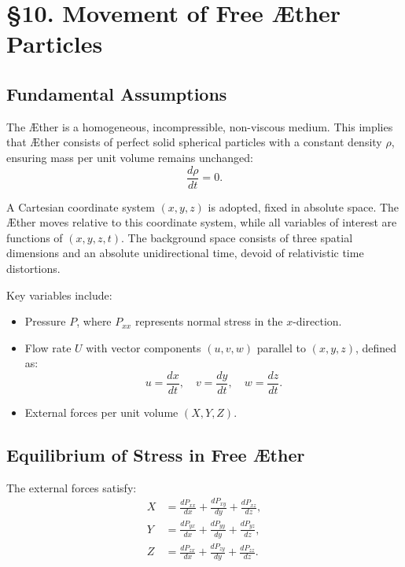 

    \section*{§10. Movement of Free Æther Particles}

    \subsection*{Fundamental Assumptions}
    The Æther is a homogeneous, incompressible, non-viscous medium. This implies that Æther consists of perfect solid spherical particles with a constant density $\rho$, ensuring mass per unit volume remains unchanged:
    \begin{equation}
        \frac{d \rho}{d t} = 0.
    \end{equation}

    A Cartesian coordinate system $(x, y, z)$ is adopted, fixed in absolute space. The Æther moves relative to this coordinate system, while all variables of interest are functions of $(x, y, z, t)$. The background space consists of three spatial dimensions and an absolute unidirectional time, devoid of relativistic time distortions.

    Key variables include:
    \begin{itemize}
        \item Pressure $P$, where $P_{xx}$ represents normal stress in the $x$-direction.
        \item Flow rate $U$ with vector components $(u, v, w)$ parallel to $(x, y, z)$, defined as:
        \begin{equation}
            u = \frac{dx}{dt}, \quad v = \frac{dy}{dt}, \quad w = \frac{dz}{dt}.
        \end{equation}
        \item External forces per unit volume $(X, Y, Z)$.
    \end{itemize}

    \subsection*{Equilibrium of Stress in Free Æther}
    The external forces satisfy:
    \begin{align}
        X &= \frac{d P_{xx}}{dx} + \frac{d P_{xy}}{dy} + \frac{d P_{xz}}{dz}, \\
        Y &= \frac{d P_{yx}}{dx} + \frac{d P_{yy}}{dy} + \frac{d P_{yz}}{dz}, \\
        Z &= \frac{d P_{zx}}{dx} + \frac{d P_{zy}}{dy} + \frac{d P_{zz}}{dz}.
    \end{align}

